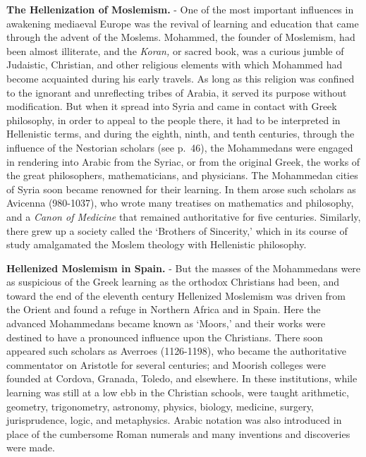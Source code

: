 \documentclass[
]{book}
\begin{document}
\textbf{The Hellenization of Moslemism.} - One of the most important influences in awakening mediaeval Europe was the revival of learning and education that came through the advent of the Moslems. Mohammed, the founder of Moslemism, had been almost illiterate, and the \emph{Koran,} or sacred book, was a curious jumble of Judaistic, Christian, and other religious elements with which Mohammed had become acquainted during his early travels. As long as this religion was confined to the ignorant and unreflecting tribes of Arabia, it served its purpose without modification. But when it spread into Syria and came in contact with Greek philosophy, in order to appeal to the people there, it had to be interpreted in Hellenistic terms, and during the eighth, ninth, and tenth centuries, through the influence of the Nestorian scholars (see p.~46), the Mohammedans were engaged in rendering into Arabic from the Syriac, or from the original Greek, the works of the great philosophers, mathematicians, and physicians. The Mohammedan cities of Syria soon became renowned for their learning. In them arose such scholars as Avicenna (980-1037), who wrote many treatises on mathematics and philosophy, and a \emph{Canon of Medicine} that remained authoritative for five centuries. Similarly, there grew up a society called the `Brothers of Sincerity,' which in its course of study amalgamated the Moslem theology with Hellenistic philosophy.

\textbf{Hellenized Moslemism in Spain.} - But the masses of the Mohammedans were as suspicious of the Greek learning as the orthodox Christians had been, and toward the end of the eleventh century Hellenized Moslemism was driven from the Orient and found a refuge in Northern Africa and in Spain. Here the advanced Mohammedans became known as `Moors,' and their works were destined to have a pronounced influence upon the Christians. There soon appeared such scholars as Averroes (1126-1198), who became the authoritative commentator on Aristotle for several centuries; and Moorish colleges were founded at Cordova, Granada, Toledo, and elsewhere. In these institutions, while learning was still at a low ebb in the Christian schools, were taught arithmetic, geometry, trigonometry, astronomy, physics, biology, medicine, surgery, jurisprudence, logic, and metaphysics. Arabic notation was also introduced in place of the cumbersome Roman numerals and many inventions and discoveries were made.
\end{document}
